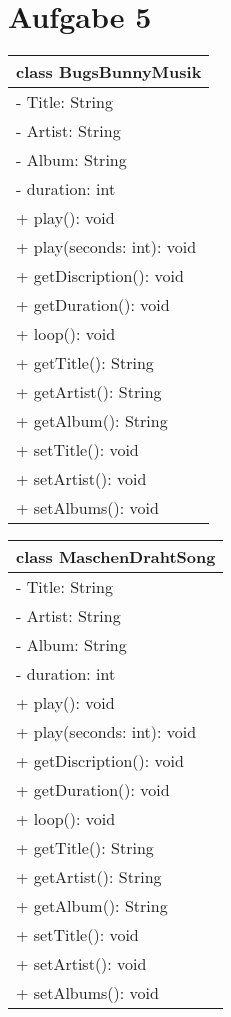 \documentclass{scrartcl}
\begin{document}
\section*{Aufgabe 5}
\begin{tabular}{|p{}|}
\hline
	class BugsBunnyMusik\\
\hline
	- Title: String\\
	- Artist: String\\
	- Album: String\\
	- duration: int\\
\hline
	+ play(): void\\
	+ play(seconds: int): void\\
	+ getDiscription(): void\\
	+ getDuration(): void\\
	+ loop(): void\\
	+ getTitle(): String\\
	+ getArtist(): String\\
	+ getAlbum(): String\\
	+ setTitle(): void\\
	+ setArtist(): void\\
	+ setAlbums(): void\\
\hline
\end{tabular}
\begin{tabular}{|p{}|}
\hline
	class MaschenDrahtSong\\
\hline
	- Title: String\\
	- Artist: String\\
	- Album: String\\
	- duration: int\\
\hline
	+ play(): void\\
	+ play(seconds: int): void\\
	+ getDiscription(): void\\
	+ getDuration(): void\\
	+ loop(): void\\
	+ getTitle(): String\\
	+ getArtist(): String\\
	+ getAlbum(): String\\
	+ setTitle(): void\\
	+ setArtist(): void\\
	+ setAlbums(): void\\
\hline
\end{tabular}
\end{document}
